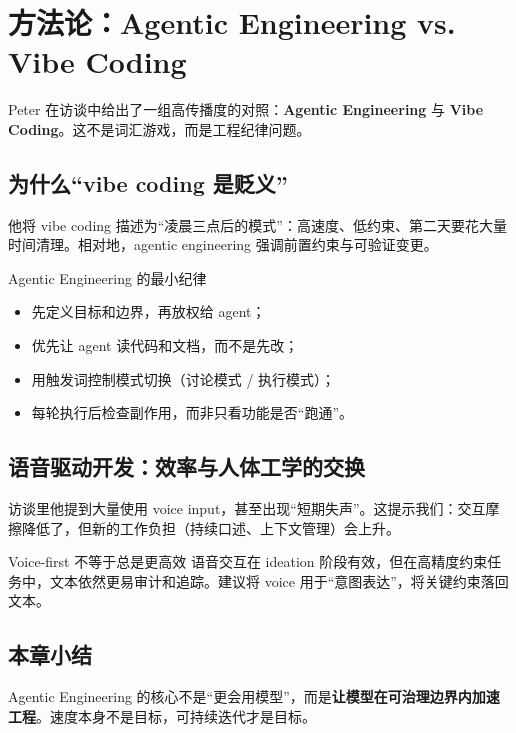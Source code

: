 \section{方法论：Agentic Engineering vs. Vibe Coding}

Peter 在访谈中给出了一组高传播度的对照：\textbf{Agentic Engineering} 与 \textbf{Vibe Coding}。这不是词汇游戏，而是工程纪律问题。

\subsection{为什么“vibe coding 是贬义”}

他将 vibe coding 描述为“凌晨三点后的模式”：高速度、低约束、第二天要花大量时间清理。相对地，agentic engineering 强调前置约束与可验证变更。

\begin{importantbox}{Agentic Engineering 的最小纪律}
\begin{itemize}
    \item 先定义目标和边界，再放权给 agent；
    \item 优先让 agent 读代码和文档，而不是先改；
    \item 用触发词控制模式切换（讨论模式 / 执行模式）；
    \item 每轮执行后检查副作用，而非只看功能是否“跑通”。
\end{itemize}
\end{importantbox}

\subsection{语音驱动开发：效率与人体工学的交换}

访谈里他提到大量使用 voice input，甚至出现“短期失声”。这提示我们：交互摩擦降低了，但新的工作负担（持续口述、上下文管理）会上升。

\begin{warningbox}{Voice-first 不等于总是更高效}
语音交互在 ideation 阶段有效，但在高精度约束任务中，文本依然更易审计和追踪。建议将 voice 用于“意图表达”，将关键约束落回文本。
\end{warningbox}

\subsection{本章小结}
Agentic Engineering 的核心不是“更会用模型”，而是\textbf{让模型在可治理边界内加速工程}。速度本身不是目标，可持续迭代才是目标。

